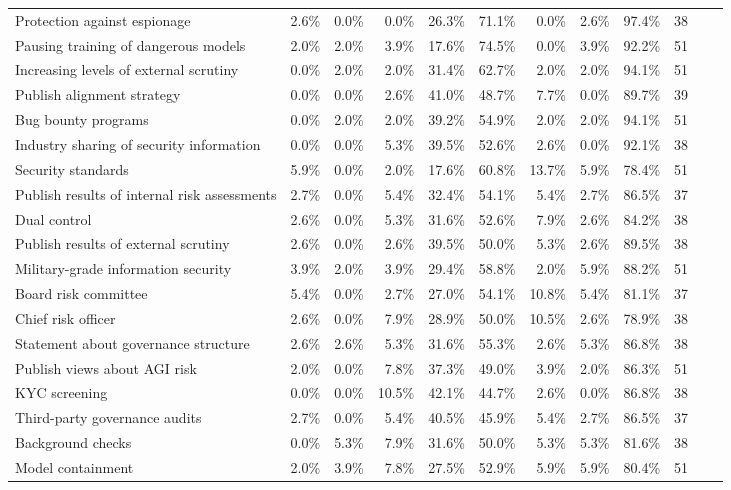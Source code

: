 \documentclass{article}
\begin{document}
\begin{sidewaystable}
\begin{tabular}{l *{11}{r}}
Protection against espionage & 2.6\% & 0.0\% & 0.0\% & 26.3\% & 71.1\% & 0.0\% & 2.6\% & 97.4\% & 38 \\
Pausing training of dangerous models & 2.0\% & 2.0\% & 3.9\% & 17.6\% & 74.5\% & 0.0\% & 3.9\% & 92.2\% & 51 \\
Increasing levels of external scrutiny & 0.0\% & 2.0\% & 2.0\% & 31.4\% & 62.7\% & 2.0\% & 2.0\% & 94.1\% & 51 \\
Publish alignment strategy & 0.0\% & 0.0\% & 2.6\% & 41.0\% & 48.7\% & 7.7\% & 0.0\% & 89.7\% & 39 \\
Bug bounty programs & 0.0\% & 2.0\% & 2.0\% & 39.2\% & 54.9\% & 2.0\% & 2.0\% & 94.1\% & 51 \\
Industry sharing of security information & 0.0\% & 0.0\% & 5.3\% & 39.5\% & 52.6\% & 2.6\% & 0.0\% & 92.1\% & 38 \\
Security standards & 5.9\% & 0.0\% & 2.0\% & 17.6\% & 60.8\% & 13.7\% & 5.9\% & 78.4\% & 51 \\
Publish results of internal risk assessments & 2.7\% & 0.0\% & 5.4\% & 32.4\% & 54.1\% & 5.4\% & 2.7\% & 86.5\% & 37 \\
Dual control & 2.6\% & 0.0\% & 5.3\% & 31.6\% & 52.6\% & 7.9\% & 2.6\% & 84.2\% & 38 \\
Publish results of external scrutiny & 2.6\% & 0.0\% & 2.6\% & 39.5\% & 50.0\% & 5.3\% & 2.6\% & 89.5\% & 38 \\
Military-grade information security & 3.9\% & 2.0\% & 3.9\% & 29.4\% & 58.8\% & 2.0\% & 5.9\% & 88.2\% & 51 \\
Board risk committee & 5.4\% & 0.0\% & 2.7\% & 27.0\% & 54.1\% & 10.8\% & 5.4\% & 81.1\% & 37 \\
Chief risk officer & 2.6\% & 0.0\% & 7.9\% & 28.9\% & 50.0\% & 10.5\% & 2.6\% & 78.9\% & 38 \\
Statement about governance structure & 2.6\% & 2.6\% & 5.3\% & 31.6\% & 55.3\% & 2.6\% & 5.3\% & 86.8\% & 38 \\
Publish views about AGI risk & 2.0\% & 0.0\% & 7.8\% & 37.3\% & 49.0\% & 3.9\% & 2.0\% & 86.3\% & 51 \\
KYC screening & 0.0\% & 0.0\% & 10.5\% & 42.1\% & 44.7\% & 2.6\% & 0.0\% & 86.8\% & 38 \\
Third-party governance audits & 2.7\% & 0.0\% & 5.4\% & 40.5\% & 45.9\% & 5.4\% & 2.7\% & 86.5\% & 37 \\
Background checks & 0.0\% & 5.3\% & 7.9\% & 31.6\% & 50.0\% & 5.3\% & 5.3\% & 81.6\% & 38 \\
Model containment & 2.0\% & 3.9\% & 7.8\% & 27.5\% & 52.9\% & 5.9\% & 5.9\% & 80.4\% & 51 \\

\end{tabular}
\end{sidewaystable}
\end{document}
